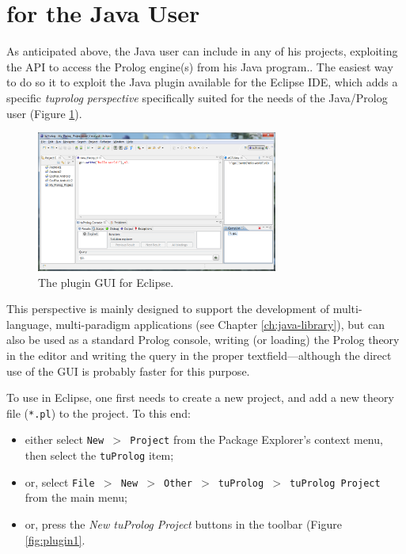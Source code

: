 \section{\tuprolog{} for the Java User}
\label{sec:java-user-perspective}

As anticipated above, the Java user can include \tuprolog{} in any of his projects, exploiting the \tuprolog{} API to access the Prolog engine(s) from his Java program..
%
The easiest way to do so it to exploit the Java plugin available for the Eclipse IDE, which adds a specific \textit{tuprolog perspective} specifically suited for the needs of the Java/Prolog user (Figure \ref{fig:tuprologPluginGUI}).

\begin{figure}
  \includegraphics[width=300px]{images/tuprologPluginGUI.png}
  \caption{The \tuprolog{} plugin GUI for Eclipse.}\label{fig:tuprologPluginGUI}
\end{figure}

This perspective is mainly designed to support the development of multi-language, multi-paradigm applications (see Chapter \ref{ch:java-library}), but can also be used as a standard Prolog console, writing (or loading) the Prolog theory in the editor and writing the query in the proper textfield---although the direct use of the \tuprolog{} GUI is probably faster for this purpose.

To use \tuprolog{} in Eclipse, one first needs to create a new \tuprolog{} project, and add a new theory file (\texttt{*.pl}) to the project.
%
To this end:%
\begin{itemize}
  \item either select \texttt{New $>$ Project} from the Package Explorer's context menu, then select the \texttt{tuProlog} item;
  \item or, select \texttt{File $>$ New $>$ Other $>$ tuProlog $>$ tuProlog Project} from the main menu;
  \item or, press the \textit{New tuProlog Project} buttons in the \tuprolog{} toolbar (Figure \ref{fig:plugin1}.
\end{itemize}

